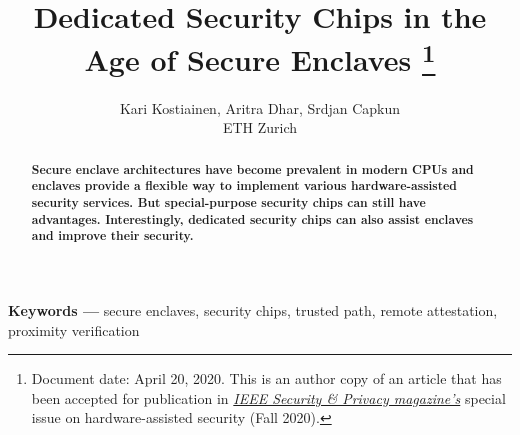 \documentclass[letterpaper,twocolumn,10pt]{article}
\title{Dedicated Security Chips in the Age of Secure Enclaves
%
\thanks{Document date: April 20, 2020. This is an author copy of an article that has been accepted for publication in \href{https://www.computer.org/csdl/magazine/sp}{\emph{IEEE Security \& Privacy magazine's}} special issue on hardware-assisted security (Fall 2020).}}
\author{Kari Kostiainen, Aritra Dhar, Srdjan Capkun \\ ETH Zurich}
\begin{document}
\maketitle
\thispagestyle{empty}

\begin{abstract}
\textbf{Secure enclave architectures have become prevalent in modern CPUs and enclaves provide a flexible way to implement various hardware-assisted security services. But special-purpose security chips can still have advantages. Interestingly, dedicated security chips can also assist enclaves and improve their security.}
\end{abstract}

\vspace{10pt}
\noindent
\textbf{Keywords ---} secure enclaves, security chips, trusted path, remote attestation, proximity verification








{\small
 

}
 
\end{document}
